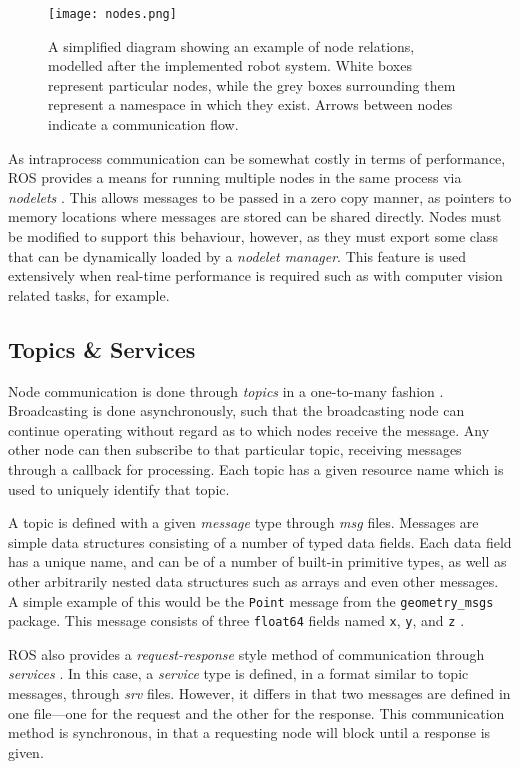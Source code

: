 \begin{figure}[!h]
    \centering
    \texttt{[image: nodes.png]}
    \caption{A simplified diagram showing an example of node relations, modelled after the implemented robot system. White boxes represent particular nodes, while the grey boxes surrounding them represent a namespace in which they exist. Arrows between nodes indicate a communication flow.}
    \label{fig:nodes}
\end{figure}

As intraprocess communication can be somewhat costly in terms of performance, ROS provides a means for running multiple nodes in the same process via \emph{nodelets} \cite{ros_wiki_nodelet}. This allows messages to be passed in a zero copy manner, as pointers to memory locations where messages are stored can be shared directly. Nodes must be modified to support this behaviour, however, as they must export some class that can be dynamically loaded by a \emph{nodelet manager}. This feature is used extensively when real-time performance is required such as with computer vision related tasks, for example.

\subsection{Topics \& Services}
Node communication is done through \emph{topics} in a one-to-many fashion \cite{ros_paper}. Broadcasting is done asynchronously, such that the broadcasting node can continue operating without regard as to which nodes receive the message. Any other node can then subscribe to that particular topic, receiving messages through a callback for processing. Each topic has a given resource name which is used to uniquely identify that topic.

A topic is defined with a given \emph{message} type through \emph{msg} files. Messages are simple data structures consisting of a number of typed data fields. Each data field has a unique name, and can be of a number of built-in primitive types, as well as other arbitrarily nested data structures such as arrays and even other messages. A simple example of this would be the \texttt{Point} message from the \texttt{geometry\_msgs} package. This message consists of three \texttt{float64} fields named \texttt{x}, \texttt{y}, and \texttt{z} \cite{ros_api_point_msg}.

ROS also provides a \emph{request-response} style method of communication through \emph{services} \cite{ros_wiki_services}. In this case, a \emph{service} type is defined, in a format similar to topic messages, through \emph{srv} files. However, it differs in that two messages are defined in one file---one for the request and the other for the response. This communication method is synchronous, in that a requesting node will block until a response is given. 

